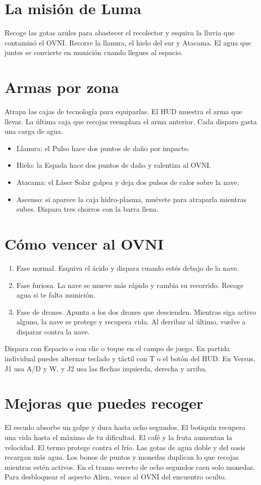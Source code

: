 \section{La misión de Luma}
Recoge las gotas azules para abastecer el recolector y esquiva la lluvia que contaminó el OVNI. Recorre la llanura, el hielo del sur y Atacama. El agua que juntes se convierte en munición cuando llegues al espacio.

\section{Armas por zona}
Atrapa las cajas de tecnología para equiparlas. El HUD muestra el arma que llevas. La última caja que recojas reemplaza el arma anterior. Cada disparo gasta una carga de agua.
\begin{itemize}
  \item Llanura: el Pulso hace dos puntos de daño por impacto.
  \item Hielo: la Espada hace dos puntos de daño y ralentiza al OVNI.
  \item Atacama: el Láser Solar golpea y deja dos pulsos de calor sobre la nave.
  \item Ascenso: si aparece la caja hidro-plasma, muévete para atraparla mientras subes. Dispara tres chorros con la barra llena.
\end{itemize}

\section{Cómo vencer al OVNI}
\begin{enumerate}
  \item Fase normal. Esquiva el ácido y dispara cuando estés debajo de la nave.
  \item Fase furiosa. La nave se mueve más rápido y cambia su recorrido. Recoge agua si te falta munición.
  \item Fase de drones. Apunta a los dos drones que descienden. Mientras siga activo alguno, la nave se protege y recupera vida. Al derribar al último, vuelve a disparar contra la nave.
\end{enumerate}
Dispara con Espacio o con clic o toque en el campo de juego. En partida individual puedes alternar teclado y táctil con T o el botón del HUD. En Versus, J1 usa A/D y W, y J2 usa las flechas izquierda, derecha y arriba.

\section{Mejoras que puedes recoger}
El escudo absorbe un golpe y dura hasta ocho segundos. El botiquín recupera una vida hasta el máximo de tu dificultad. El café y la fruta aumentan la velocidad. El termo protege contra el frío. Las gotas de agua doble y del oasis recargan más agua. Los bonos de puntos y monedas duplican lo que recojas mientras estén activos. En el tramo secreto de ocho segundos caen solo monedas. Para desbloquear el aspecto Alien, vence al OVNI del encuentro oculto.


